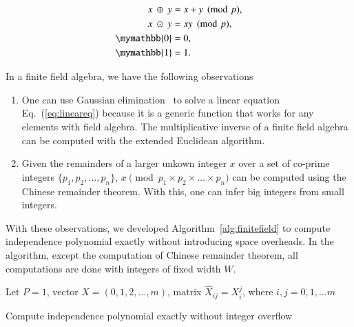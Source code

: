 \documentclass[review,onefignum,onetabnum]{siamart190516}
\newcommand{\<}{\langle}
\renewcommand{\>}{\rangle}
\newcommand{\Eq}[1]{Eq.~(\ref{#1})}
\begin{document}
\begin{align}
\begin{split}
    x ~\oplus~ y &= x+y\pmod p,\\
    x ~\odot~ y &= xy\pmod p,\\
    \mymathbb{0} &= 0,\\
    \mymathbb{1} &= 1.
\end{split}\label{eq:finitefield}
\end{align}

In a finite field algebra, we have the following observations
\begin{enumerate}
    \item One can use Gaussian elimination~\cite{Golub2013} to solve a linear equation \Eq{eq:lineareq}
    because it is a generic function that works for any elements with field algebra.
    The multiplicative inverse of a finite field algebra can be computed with the extended Euclidean algorithm.
    \item Given the remainders of a larger unkown integer $x$ over a set of co-prime integers $\{p_1, p_2, \ldots, p_n\}$,
    $x \pmod {p_1 \times p_2 \times \ldots \times p_n}$ can be computed using the Chinese remainder theorem.
    With this, one can infer big integers from small integers.
\end{enumerate}
With these observations, we developed Algorithm~\ref{alg:finitefield} to compute independence polynomial exactly without introducing space overheads.
In the algorithm, except the computation of Chinese remainder theorem, all computations are done with integers of fixed width $W$.

\begin{algorithm}[!ht]
    \small
    \SetAlgoNoLine
    \LinesNumbered
    Let $P = 1$, vector $X = (0,1,2,\ldots,m)$, matrix $\hat X_{ij} = X_i^j$, where $i,j = 0, 1, \ldots m$\;

    \caption{Compute independence polynomial exactly without integer overflow}\label{alg:finitefield}
\end{algorithm}
\end{document}
